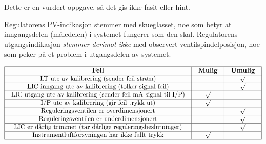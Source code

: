 \eject






Dette er en vurdert oppgave, så det gis ikke fasit eller hint.







Regulatorens PV-indikasjon stemmer med skueglasset, noe som betyr at inngangsdelen (måledelen) i systemet fungerer som den skal. Regulatorens utgangsindikasjon \textit{stemmer derimot ikke} med observert ventilspindelposisjon, noe som peker på et problem i utgangsdelen av systemet.


$$\vbox{\offinterlineskip
\halign{\strut
\vrule \quad\hfil # \ \hfil & 
\vrule \quad\hfil # \ \hfil & 
\vrule \quad\hfil # \ \hfil \vrule \cr
\noalign{\hrule}
%
{\bf Feil} & {\bf Mulig} & {\bf Umulig} \cr
%
\noalign{\hrule}
%
LT ute av kalibrering (sender feil strøm) &  & $\surd$ \cr
%
\noalign{\hrule}
%
LIC-inngang ute av kalibrering (tolker signal feil) &  & $\surd$ \cr
%
\noalign{\hrule}
%
LIC-utgang ute av kalibrering (sender feil mA-signal til I/P) & $\surd$ &  \cr
%
\noalign{\hrule}
%
I/P ute av kalibrering (gir feil trykk ut) & $\surd$ &  \cr
%
\noalign{\hrule}
%
Reguleringsventilen er overdimensjonert &  & $\surd$ \cr
%
\noalign{\hrule}
%
Reguleringsventilen er underdimensjonert &  & $\surd$ \cr
%
\noalign{\hrule}
%
LIC er dårlig trimmet (tar dårlige reguleringsbeslutninger) &  & $\surd$ \cr
%
\noalign{\hrule}
%
Instrumentluftforsyningen har ikke fullt trykk & $\surd$ &  \cr
%
\noalign{\hrule}
} %
}$$ %


